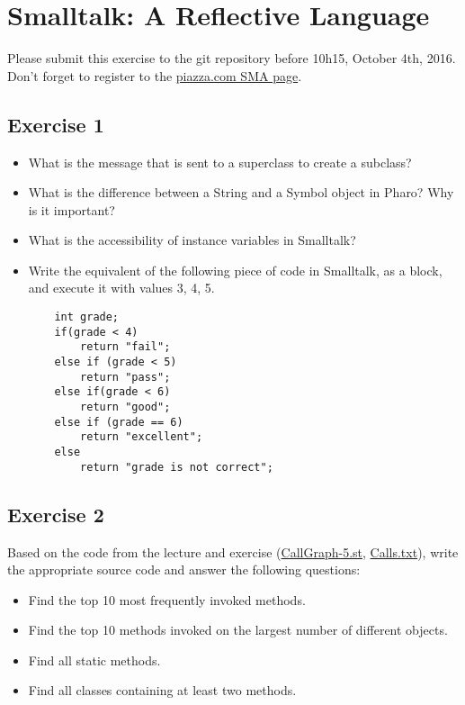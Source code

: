 \documentclass [11pt, a4wide, twoside]{article}
\begin{document}
\section*{Smalltalk: A Reflective Language}


Please submit this exercise to the git repository before 10h15, October 4th, 2016.
Don't forget to register to the  \href{https://piazza.com/unibe.ch/fall2016/sma21045}{piazza.com SMA page}.

\subsection*{Exercise 1}
\begin{itemize}
\item What is the message that is sent to a superclass to create a subclass?
\item What is the difference between a String and a Symbol object in Pharo? Why is it important?
\item What is the accessibility of instance variables in Smalltalk?
\item Write the equivalent of the following piece of code in Smalltalk, as a block, and execute it with values 3, 4, 5.
	\begin{lstlisting}
   	int grade;
	if(grade < 4)
		return "fail";
	else if (grade < 5)
		return "pass";
	else if(grade < 6)
		return "good";
	else if (grade == 6)
		return "excellent";
	else
		return "grade is not correct";
\end{lstlisting}
	
\end{itemize}

\subsection*{Exercise 2}

Based on the code from the lecture and exercise (\href{http://scg.unibe.ch/download/lectures/sma/Demos/CallGraphDemo/CallGraph-5.st}{CallGraph-5.st}, \href{http://scg.unibe.ch/download/lectures/sma/Demos/CallGraphDemo/Calls.txt}{Calls.txt}), write the appropriate source code and answer the following questions:
\begin{itemize}
\item Find the top 10 most frequently invoked methods.
\item Find the top 10 methods invoked on the largest number of different objects.
\item Find all static methods.
\item Find all classes containing at least two methods.

\end{itemize}
\end{document}
